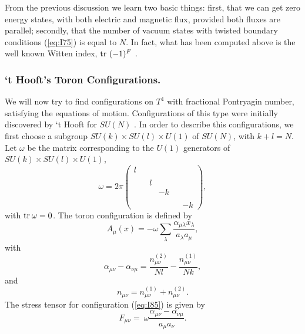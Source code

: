 From the previous discussion we learn two basic things: first,
that we can get zero energy states, with both electric and
magnetic flux, provided both fluxes are parallel; secondly, that
the number of vacuum states with twisted boundary conditions
(\ref{eq:I75}) is equal to $N$. In fact, what has been computed
above is the well known Witten index, $\hbox {tr }(-1)^F$ \cite{Wind}.


\subsubsection{`t Hooft's Toron Configurations.}
\label{sec:52}

We will now try to find configurations on $T^4$ with fractional
Pontryagin number, satisfying the equations of motion.
Configurations of this type were initially discovered by `t Hooft
for $SU(N)$ \cite{tHcmp}. In order to describe this configurations, we first
choose a subgroup $SU(k) \times SU(l) \times U(1)$ of $SU(N)$, with
$k+l=N$. Let $\omega$ be the matrix corresponding to the $U(1)$
generators of $SU(k) \times SU(l) \times U(1)$,
\begin{equation}
\omega = 2 \pi \left( \begin{array}{cccccc} l &   &   &    &   &    \\
					      &   &   &    &   &    \\
					      &   & l &    &   &    \\
					      &   &   & -k &   &    \\
					      &   &   &    &   &   \\
					      &   &   &    &   & -k
	\end{array} \right), 
\label{eq:I84}
\end{equation}
with $\hbox {tr} \: \omega=0$. The toron
configuration is defined by
\begin{equation}
A_{\mu}(x) = - \omega \sum_{\lambda} \frac {\alpha_{\mu \lambda}
x_{\lambda}}{a_{\lambda}a_{\mu}},
\label{eq:I85}
\end{equation}
with 
\begin{equation}
\alpha_{\mu \nu}-\alpha_{\nu \mu} = \frac {n_{\mu \nu}^{(2)}}{Nl}
- \frac {n_{\mu \nu}^{(1)}}{Nk},
\label{eq:I86}
\end{equation}
and
\begin{equation}
n_{\mu \nu} = n_{\mu \nu}^{(1)} + n_{\mu \nu}^{(2)}.
\label{eq:I87}
\end{equation}
The stress tensor for configuration (\ref{eq:I85}) is given by 
\begin{equation}
F_{\mu \nu}= \ \omega \frac {\alpha_{\mu \nu}-\alpha_{\nu
\mu}}{a_{\mu} a_{\nu}}.
\label{eq:I88}
\end{equation}
